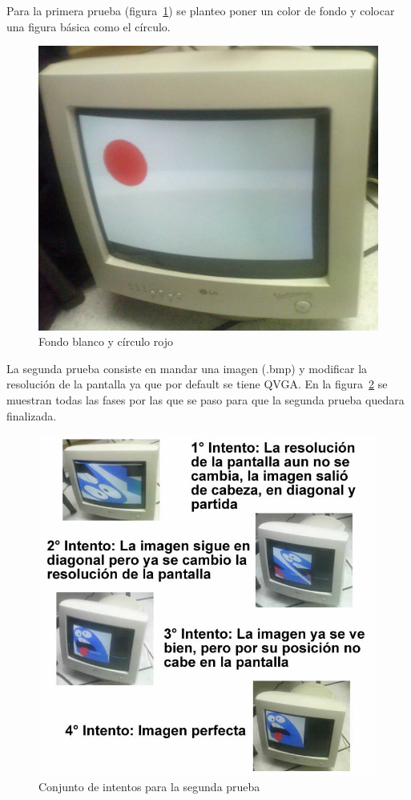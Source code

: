 Para la primera prueba (figura~\ref{fig:fcirculo}) se planteo poner un color de fondo y colocar una figura b\'asica como el c\'irculo.\medskip

\begin{figure}[H]
\centering
\includegraphics[scale=0.1]{fcirculo}
\caption{Fondo blanco y c\'irculo rojo}\label{fig:fcirculo}
\end{figure}

La segunda prueba consiste en mandar una imagen (.bmp) y modificar la resoluci\'on de la pantalla ya que por default se tiene QVGA. En la figura~\ref{fig:prueba} se muestran todas las fases por las que se paso para que la segunda prueba quedara finalizada.\medskip

\begin{figure}[H]
\centering
\includegraphics[scale=0.5]{prueba}
\caption{Conjunto de intentos para la segunda prueba}\label{fig:prueba}
\end{figure}

